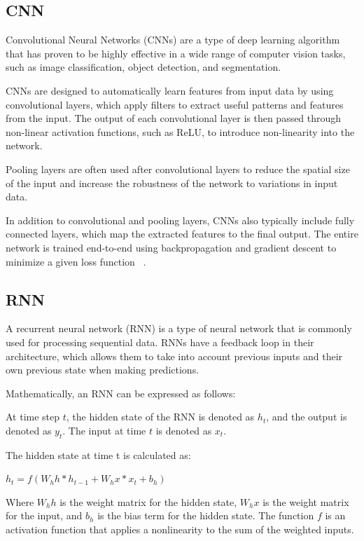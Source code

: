 \documentclass[final]{cvpr}
\begin{document}
\subsection{CNN}

Convolutional Neural Networks (CNNs) are a type of deep learning algorithm that has proven to be highly effective in a wide range of computer vision tasks, such as image classification, object detection, and segmentation.

CNNs are designed to automatically learn features from input data by using convolutional layers, which apply filters to extract useful patterns and features from the input. The output of each convolutional layer is then passed through non-linear activation functions, such as ReLU, to introduce non-linearity into the network.

Pooling layers are often used after convolutional layers to reduce the spatial size of the input and increase the robustness of the network to variations in input data.

In addition to convolutional and pooling layers, CNNs also typically include fully connected layers, which map the extracted features to the final output. The entire network is trained end-to-end using backpropagation and gradient descent to minimize a given loss function ~\cite{726791,NIPS2012_4824,he2016deep,szegedy2015going,zeiler2014visualizing,srivastava2015highway,zagoruyko2016wide, simonyan2014very,zhang2017polynet,ioffe2015batch,huang2017densely,chollet2017xception}.

\subsection{RNN}

A recurrent neural network (RNN) is a type of neural network that is commonly used for processing sequential data. RNNs have a feedback loop in their architecture, which allows them to take into account previous inputs and their own previous state when making predictions.

Mathematically, an RNN can be expressed as follows:

At time step $t$, the hidden state of the RNN is denoted as $h_t$, and the output is denoted as $y_t$. The input at time $t$ is denoted as $x_t$.

The hidden state at time t is calculated as:

$h_t = f(W_hh * h_{t-1} + W_hx * x_t + b_h)$

Where $W_hh$ is the weight matrix for the hidden state, $W_hx$ is the weight matrix for the input, and $b_h$ is the bias term for the hidden state. The function $f$ is an activation function that applies a nonlinearity to the sum of the weighted inputs.
\end{document}
